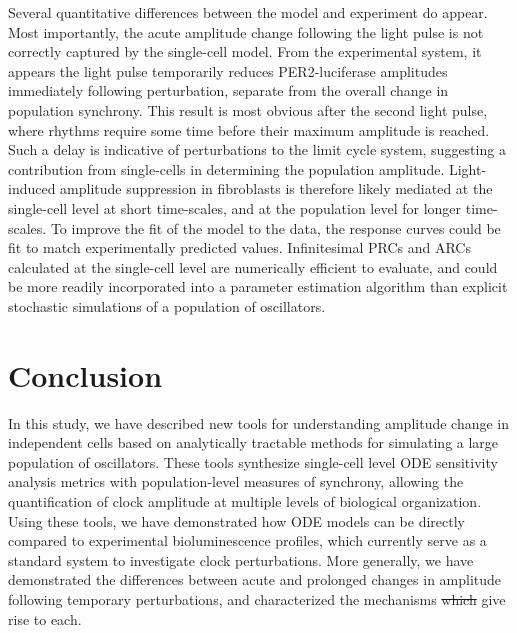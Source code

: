 \documentclass[11pt, letterpaper]{article}
\providecommand{\DIFadd}[1]{{\protect\color{blue}\uwave{#1}}} %
\providecommand{\DIFdel}[1]{{\protect\color{red}\sout{#1}}}                      %
\providecommand{\DIFaddbegin}{} %
\providecommand{\DIFaddend}{} %
\providecommand{\DIFdelbegin}{} %
\providecommand{\DIFdelend}{} %
\begin{document}
Several quantitative differences between the model and experiment do appear.
Most importantly, the acute amplitude change following the light pulse is not
correctly captured by the single-cell model. From the experimental system, it
appears the light pulse temporarily reduces PER2-luciferase amplitudes
immediately following perturbation, separate from the overall change in
population synchrony. This result is most obvious after the second light pulse,
where rhythms require some time before their maximum amplitude is reached. Such
a delay is indicative of perturbations to the limit cycle system, suggesting a
contribution from single-cells in determining the population amplitude.
Light-induced amplitude suppression in fibroblasts is therefore likely mediated
at the single-cell level at short time-scales, and at the population level for
longer time-scales. To improve the fit of the model to the data, the response
curves could be fit to match experimentally predicted values. Infinitesimal PRCs
and ARCs calculated at the single-cell level are numerically efficient to
evaluate, and could be more readily incorporated into a parameter estimation
algorithm than explicit stochastic simulations of a population of oscillators.

\section*{Conclusion}

In this study, we have described new tools for understanding amplitude change in
independent cells based on analytically tractable methods for simulating a large
population of oscillators. These tools synthesize single-cell level ODE
sensitivity analysis metrics with population-level measures of synchrony,
allowing the quantification of clock amplitude at multiple levels of biological
organization. Using these tools, we have demonstrated how ODE models can be
directly compared to experimental bioluminescence profiles, which currently
serve as a standard system to investigate clock perturbations. More generally,
we have demonstrated the differences between acute and prolonged changes in
amplitude following temporary perturbations, and characterized the mechanisms
\DIFdelbegin \DIFdel{which }\DIFdelend \DIFaddbegin \DIFadd{that }\DIFaddend give rise to each.
\end{document}
